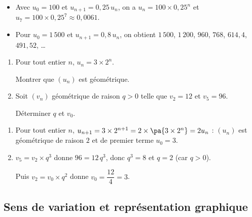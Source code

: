 \documentclass{poly}
\begin{document}
\begin{ex}
	\begin{itemize}
		\item Avec $u_0 = 100$ et $u_{n+1} = 0{,}25\,u_n$, on a $u_n = 100 \times 0{,}25^n$ et $u_7 = 100 \times 0{,}25^7 \approx 0{,}0061$.
		\item Pour $u_0 = 1\,500$ et $u_{n+1} = 0{,}8\,u_n$, on obtient $1\,500$, $1\,200$, $960$, $768$, $614{,}4$, $491{,}52$, \dots
	\end{itemize}
\end{ex}

\begin{methode}
	\begin{enumerate}
		\item Pour tout entier $n$, $u_n = 3 \times 2^n$.

		      Montrer que $(u_n)$ est géométrique.
		\item Soit $(v_n)$ géométrique de raison $q > 0$ telle que $v_2 = 12$ et $v_5 = 96$.

		      Déterminer $q$ et $v_0$.
	\end{enumerate}

	\begin{correction}
		\nline
		\begin{enumerate}
			\item Pour tout entier $n$, $u_{n+1} = 3 \times 2^{n+1} = 2 \times \pa{3 \times 2^n} = 2u_n$ : $(u_n)$ est géométrique de raison $2$ et de premier terme $u_0 = 3$.
			\item $v_5 = v_2 \times q^3$ donne $96 = 12\,q^3$, donc $q^3 = 8$ et $q = 2$ (car $q > 0$).

			      Puis $v_2 = v_0 \times q^2$ donne $v_0 = \dfrac{12}{4} = 3$.
		\end{enumerate}
	\end{correction}
\end{methode}

\subsection{Sens de variation et représentation graphique}
\end{document}
